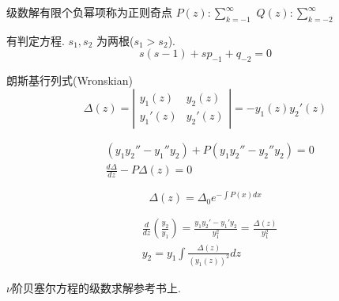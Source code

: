 级数解有限个负幂项称为正则奇点 $P(z): \sum_{k=-1}^{\infty}$
$Q(z) : \sum_{k=-2}^{\infty}$

有判定方程. $s_1, s_2$ 为两根($s_1> s_2$).
$$
s(s-1)+s p_{-1}+q_{-2}=0
$$

朗斯基行列式(Wronskian)
$$
\Delta(z)=\left|\begin{array}{ll}
y_1(z) & y_2(z) \\
y_1'(z) & y_2'(z)
\end{array}\right|=-y_1(z) y_2'(z)
$$

$$
\begin{aligned}
& \left(y_1 y_2''-y_1'' 
y_2\right)+P\left(y_1 y_2''-y_2'' y_2\right) = 0\\
& \frac{d \Delta}{d z} - P \Delta(z)=0
\end{aligned}
$$

$$
\Delta(z)=\Delta_0 e^{-\int P(x) d x}
$$

$$
\begin{aligned}
& \frac{d}{d z}\left(\frac{y_{2}}{y_1}\right)=\frac{y_{1} y_{2}'-y_{1}' y_{2}}{y_{1}^2}=\frac{\Delta(z)}{y_{1}^2} \\
& y_{2}=y_{1} \int \frac{\Delta(z)}{\left(y_{1}(z)\right)^2} d z
\end{aligned}
$$

$\nu$阶贝塞尔方程的级数求解参考书上.